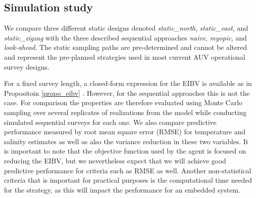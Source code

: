 \documentclass[aoas]{imsart}
\begin{document}
\subsection{Simulation study}
\label{sec:simulations}

\label{sec:sampling_designs}


We compare three different static designs denoted
\textit{static\_north}, \textit{static\_east}, and
\textit{static\_zigzag} with the three described sequential approaches
\textit{naive}, \textit{myopic}, and \textit{look-ahead}. The static
sampling paths are pre-determined and cannot be altered and represent
the pre-planned strategies used in most current AUV operational survey
designs.

For a fixed survey length, a closed-form expression for the EIBV is
available as in Propositoin \ref{propo_eibv}
. However, for the sequential
approaches this is not the case. For comparison the properties are
therefore evaluated using Monte Carlo sampling over several replicates
of realizations from the model while conducting simulated sequential
surveys for each one. We also compare predictive
performance measured by root mean square error (RMSE) for temperature
and salinity estimates as well as also the variance reduction in these
two variables. It is important to note that the objective function
used by the agent  is focused on reducing the
EIBV, but we nevertheless expect that we will achieve good predictive
performance for criteria such as RMSE as well. Another non-statistical
criteria that is important for practical purposes is the computational
time needed for the strategy, as this will impact the performance for
an embedded system.

\end{document}
